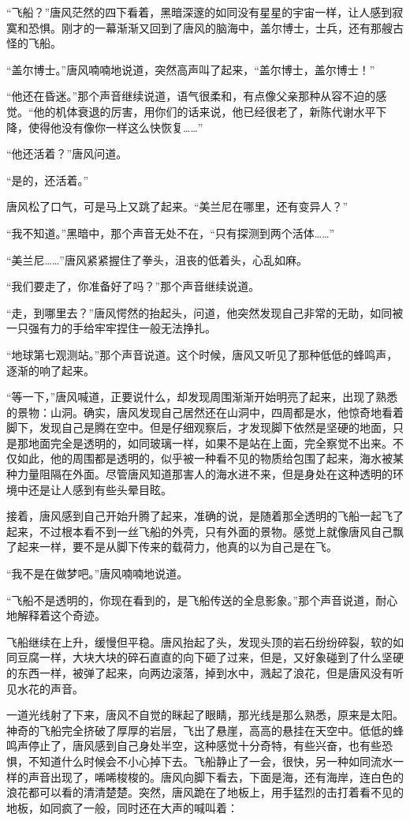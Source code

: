 “飞船？”唐风茫然的四下看着，黑暗深邃的如同没有星星的宇宙一样，让人感到寂寞和恐惧。刚才的一幕渐渐又回到了唐风的脑海中，盖尔博士，士兵，还有那艘古怪的飞船。

“盖尔博士。”唐风喃喃地说道，突然高声叫了起来，“盖尔博士，盖尔博士！”

“他还在昏迷。”那个声音继续说道，语气很柔和，有点像父亲那种从容不迫的感觉。“他的机体衰退的厉害，用你们的话来说，他已经很老了，新陈代谢水平下降，使得他没有像你一样这么快恢复……”

“他还活着？”唐风问道。

“是的，还活着。”

唐风松了口气，可是马上又跳了起来。“美兰尼在哪里，还有变异人？”

“我不知道。”黑暗中，那个声音无处不在，“只有探测到两个活体……”

“美兰尼……”唐风紧紧握住了拳头，沮丧的低着头，心乱如麻。

“我们要走了，你准备好了吗？”那个声音继续说道。

“走，到哪里去？”唐风愕然的抬起头，问道，他突然发现自己非常的无助，如同被一只强有力的手给牢牢捏住一般无法挣扎。

“地球第七观测站。”那个声音说道。这个时候，唐风又听见了那种低低的蜂鸣声，逐渐的响了起来。

“等一下，”唐风喊道，正要说什么，却发现周围渐渐开始明亮了起来，出现了熟悉的景物：山洞。确实，唐风发现自己居然还在山洞中，四周都是水，他惊奇地看着脚下，发现自己是腾在空中。但是仔细观察后，才发现脚下依然是坚硬的地面，只是那地面完全是透明的，如同玻璃一样，如果不是站在上面，完全察觉不出来。不仅如此，他的周围都是透明的，似乎被一种看不见的物质给包围了起来，海水被某种力量阻隔在外面。尽管唐风知道那害人的海水进不来，但是身处在这种透明的环境中还是让人感到有些头晕目眩。

接着，唐风感到自己开始升腾了起来，准确的说，是随着那全透明的飞船一起飞了起来，不过根本看不到一丝飞船的外壳，只有外面的景物。感觉上就像唐风自己飘了起来一样，要不是从脚下传来的载荷力，他真的以为自己是在飞。

“我不是在做梦吧。”唐风喃喃地说道。

“飞船不是透明的，你现在看到的，是飞船传送的全息影象。”那个声音说道，耐心地解释着这个奇迹。

飞船继续在上升，缓慢但平稳。唐风抬起了头，发现头顶的岩石纷纷碎裂，软的如同豆腐一样，大块大块的碎石直直的向下砸了过来，但是，又好象碰到了什么坚硬的东西一样，被弹了起来，向两边滚落，掉到水中，溅起了浪花，但是唐风没有听见水花的声音。

一道光线射了下来，唐风不自觉的眯起了眼睛，那光线是那么熟悉，原来是太阳。神奇的飞船完全挤破了厚厚的岩层，飞出了悬崖，高高的悬挂在天空中。低低的蜂鸣声停止了，唐风感到自己身处半空，这种感觉十分奇特，有些兴奋，也有些恐惧，不知道什么时候会不小心掉下去。飞船静止了一会，很快，另一种如同流水一样的声音出现了，唏唏梭梭的。唐风向脚下看去，下面是海，还有海岸，连白色的浪花都可以看的清清楚楚。突然，唐风跪在了地板上，用手猛烈的击打着看不见的地板，如同疯了一般，同时还在大声的喊叫着：

